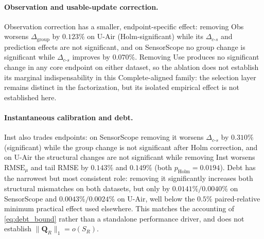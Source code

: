 \documentclass[letterpaper,journal]{IEEEtran}
\begin{document}
\paragraph{Observation and usable-update correction.}
Observation correction has a smaller, endpoint-specific effect: removing Obs
worsens $\Delta_{\mathrm{group}}$ by $0.123\%$ on U-Air (Holm-significant) while
its $\Delta_{c\text{-}s}$ and prediction effects are not significant, and on
SensorScope no group change is significant while $\Delta_{c\text{-}s}$ improves
by $0.070\%$.  Removing Use produces no significant change in any core endpoint
on either dataset, so the ablation does not establish its marginal
indispensability in this Complete-aligned family: the selection layer remains
distinct in the factorization, but its isolated empirical effect is not
established here.

\paragraph{Instantaneous calibration and debt.}
Inst also trades endpoints: on SensorScope removing it worsens
$\Delta_{c\text{-}s}$ by $0.310\%$ (significant) while the group change is not
significant after Holm correction, and on U-Air the structural changes are not
significant while removing Inst worsens $\mathrm{RMSE}_{\mu}$ and tail RMSE by
$0.143\%$ and $0.149\%$ (both $p_{\mathrm{Holm}}=0.0194$).  Debt has the
narrowest but most consistent role: removing it significantly increases both
structural mismatches on both datasets, but only by $0.0141\%/0.0040\%$ on
SensorScope and $0.0043\%/0.0024\%$ on U-Air, well below the $0.5\%$
paired-relative minimum practical effect used elsewhere.  This matches the
accounting of \eqref{eq:debt_bound} rather than a standalone performance driver,
and does not establish $\|\mathbf Q_R\|_1=o(S_R)$.
\end{document}
